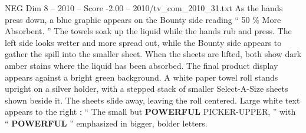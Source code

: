 \begin{textsample}{NEG Dim 8 – 2010 – Score -2.00 – 2010/tv\_com\_2010\_31.txt}
As the hands press down, a blue graphic appears on the Bounty side reading “ 50 \% More Absorbent. ” The towels soak up the liquid while the hands rub and press.
The left side looks wetter and more spread out, while the Bounty side appears to gather the spill into the smaller sheet.
When the sheets are lifted, both show dark amber stains where the liquid has been absorbed.
The final product display appears against a bright green background.
A white paper towel roll stands upright on a silver holder, with a stepped stack of smaller Select-A-Size sheets shown beside it.
The sheets slide away, leaving the roll centered.
Large white text appears to the right : “ The small but \textbf{POWERFUL} PICKER-UPPER, ” with “ \textbf{POWERFUL} ” emphasized in bigger, bolder letters.

\end{textsample}
